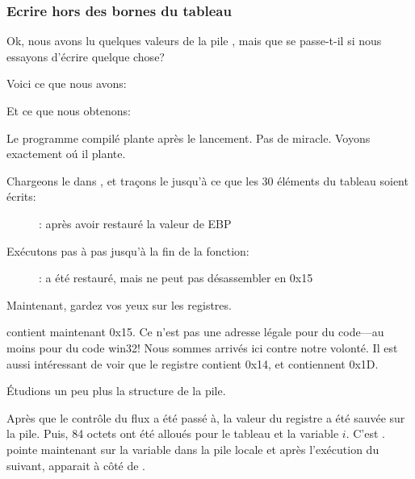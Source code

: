 \subsubsection{Ecrire hors des bornes du tableau}

Ok, nous avons lu quelques valeurs de la pile , mais que se passe-t-il
si nous essayons d'écrire quelque chose?

Voici ce que nous avons:




Et ce que nous obtenons:



Le programme compilé plante après le lancement. Pas de miracle. Voyons exactement
oú il plante.

\clearpage
\myindex{\olly}

Chargeons le dans \olly, et traçons le jusqu'à ce que les 30 éléments du tableau
soient écrits:

\begin{figure}[H]
\centering
{}
\caption{\olly: après avoir restauré la valeur de EBP}
\label{fig:array_BO_olly_w1}
\end{figure}

\clearpage
Exécutons pas à pas jusqu'à la fin de la fonction:

\begin{figure}[H]
\centering
{}
\caption{\olly: 
 a été restauré, mais \olly ne peut pas désassembler en 0x15}
\label{fig:array_BO_olly_w2}
\end{figure}

Maintenant, gardez vos yeux sur les registres.

\EIP contient maintenant 0x15. Ce n'est pas une adresse légale pour du code---au
moins pour du code win32!
Nous sommes arrivés ici contre notre volonté.
Il est aussi intéressant de voir que le registre \EBP contient 0x14, \ECX et \EDX
contiennent 0x1D.

Étudions un peu plus la structure de la pile.

Après que le contrôle du flux a été passé à\TT{\main}, la valeur du registre \EBP
a été sauvée sur la pile.
Puis, 84 octets ont été alloués pour le tableau et la variable $i$.
C'est .
\ESP pointe maintenant sur la variable  dans la pile locale et après l'exécution
du  suivant,  apparait à côté de .

